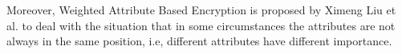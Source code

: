 Moreover, Weighted Attribute Based Encryption is proposed by Ximeng Liu et al.\cite{Ximeng:ICC'14} to deal with the situation that in some circumstances the attributes are not always in the same position, i.e,
different attributes have different importance.

